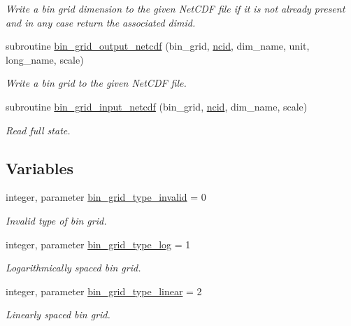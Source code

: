 \begin{DoxyCompactItemize}
\begin{DoxyCompactList}\small\item\em Write a bin grid dimension to the given Net\+C\+DF file if it is not already present and in any case return the associated dimid. \end{DoxyCompactList}\item 
subroutine \mbox{\hyperlink{namespacepmc__bin__grid_a00d8227bfb4b1e12eca6f5317dd4fd78}{bin\+\_\+grid\+\_\+output\+\_\+netcdf}} (bin\+\_\+grid, \mbox{\hyperlink{fractal_8_f90_a4e89f3f850921ff84a6dfce8b166ad50}{ncid}}, dim\+\_\+name, unit, long\+\_\+name, scale)
\begin{DoxyCompactList}\small\item\em Write a bin grid to the given Net\+C\+DF file. \end{DoxyCompactList}\item 
subroutine \mbox{\hyperlink{namespacepmc__bin__grid_a962c49d1900bde86c51da0e40d7b6110}{bin\+\_\+grid\+\_\+input\+\_\+netcdf}} (bin\+\_\+grid, \mbox{\hyperlink{fractal_8_f90_a4e89f3f850921ff84a6dfce8b166ad50}{ncid}}, dim\+\_\+name, scale)
\begin{DoxyCompactList}\small\item\em Read full state. \end{DoxyCompactList}\end{DoxyCompactItemize}
\subsection*{Variables}
\begin{DoxyCompactItemize}
\item 
integer, parameter \mbox{\hyperlink{namespacepmc__bin__grid_a1cbd1db8f8656cd463a3316504fb8ff1}{bin\+\_\+grid\+\_\+type\+\_\+invalid}} = 0
\begin{DoxyCompactList}\small\item\em Invalid type of bin grid. \end{DoxyCompactList}\item 
integer, parameter \mbox{\hyperlink{namespacepmc__bin__grid_a2132d94b8aad57a55efc8f8356690148}{bin\+\_\+grid\+\_\+type\+\_\+log}} = 1
\begin{DoxyCompactList}\small\item\em Logarithmically spaced bin grid. \end{DoxyCompactList}\item 
integer, parameter \mbox{\hyperlink{namespacepmc__bin__grid_ae02a160719a835f7ee0c048539c257cd}{bin\+\_\+grid\+\_\+type\+\_\+linear}} = 2
\begin{DoxyCompactList}\small\item\em Linearly spaced bin grid. \end{DoxyCompactList}\end{DoxyCompactItemize}


